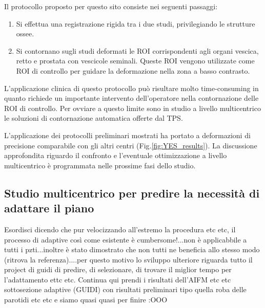 Il protocollo proposto per questo sito consiste nei seguenti passaggi:
\begin{enumerate}
\item Si effettua una registrazione rigida tra i due studi, privilegiando le strutture ossee.
\item Si contornano sugli studi deformati le ROI corrispondenti agli organi vescica, retto e prostata con vescicole seminali. Queste ROI vengono utilizzate come ROI di controllo per guidare la deformazione nella zona a basso contrasto.
\end{enumerate}
L'applicazione clinica di questo protocollo può risultare molto time-consuming in quanto richiede un importante intervento dell'operatore nella contornazione delle ROI di controllo. Per ovviare a questo limite sono in studio a livello multicentrico le soluzioni di contornazione automatica offerte dal TPS.


L'applicazione dei protocolli preliminari mostrati ha portato a deformazioni di precisione comparabile con gli altri centri (Fig.\ref{fig:YES_results}). La discussione approfondita riguardo il confronto e l'eventuale ottimizzazione a livello multicentrico è programmata nelle prossime fasi dello studio.


\subsection{Studio multicentrico per predire la necessità di adattare il piano}
Esordisci dicendo che pur velocizzando all'estremo la procedura etc etc, il processo di adaptive così come esistente è cumbersome!...non è applicabbile a tutti i pzti...inoltre è stato dimostrato che non tutti ne beneficia allo stesso modo (ritrova la referenza)....per questo motivo lo sviluppo ulteriore riguarda tutto il project di guidi di predire, di selezionare, di trovare il miglior tempo per l'adattamento ettc etc.
Continua qui prendi i risultati dell'AIFM etc etc
sottosezione adaptive (GUIDI) con risultati preliminari tipo quella roba delle parotidi etc etc e siamo quasi quasi per finire :OOO









